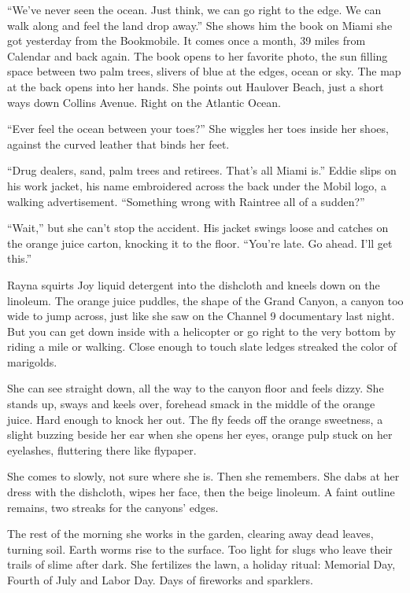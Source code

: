\documentclass[
]{article}
\begin{document}
``We've never seen the ocean. Just think, we can go right to the edge.
We can walk along and feel the land drop away.'' She shows him the book
on Miami she got yesterday from the Bookmobile. It comes once a month,
39 miles from Calendar and back again. The book opens to her favorite
photo, the sun filling space between two palm trees, slivers of blue at
the edges, ocean or sky. The map at the back opens into her hands. She
points out Haulover Beach, just a short ways down Collins Avenue. Right
on the Atlantic Ocean.

``Ever feel the ocean between your toes?'' She wiggles her toes inside
her shoes, against the curved leather that binds her feet.

``Drug dealers, sand, palm trees and retirees. That's all Miami is.''
Eddie slips on his work jacket, his name embroidered across the back
under the Mobil logo, a walking advertisement. ``Some­thing wrong with
Raintree all of a sudden?''

``Wait,'' but she can't stop the accident. His jacket swings loose and
catches on the orange juice carton, knocking it to the floor. ``You're
late. Go ahead. I'll get this.''

Rayna squirts Joy liquid detergent into the dishcloth and kneels down on
the linoleum. The orange juice puddles, the shape of the Grand Canyon, a
canyon too wide to jump across, just like she saw on the Channel 9
documentary last night. But you can get down inside with a helicopter or
go right to the very bottom by riding a mile or walking. Close enough to
touch slate ledges streaked the color of marigolds.

She can see straight down, all the way to the canyon floor and feels
dizzy. She stands up, sways and keels over, forehead smack in the middle
of the orange juice. Hard enough to knock her out. The fly feeds off the
orange sweetness, a slight buzzing beside her ear when she opens her
eyes, orange pulp stuck on her eyelashes, fluttering there like
flypaper.

She comes to slowly, not sure where she is. Then she remembers. She dabs
at her dress with the dishcloth, wipes her face, then the beige
linoleum. A faint outline remains, two streaks for the canyons' edges.

The rest of the morning she works in the garden, clearing away dead
leaves, turning soil. Earth worms rise to the surface. Too light for
slugs who leave their trails of slime after dark. She fertilizes the
lawn, a holiday ritual: Memorial Day, Fourth of July and Labor Day. Days
of fireworks and sparklers.
\end{document}
